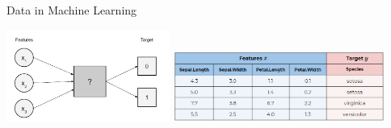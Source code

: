 \documentclass[11pt,compress,t,notes=noshow, xcolor=table]{beamer}
\begin{document}
\begin{vbframe}{Data in Machine Learning}
\begin{itemize}
    \includegraphics[width = 0.4\textwidth]{figure_man/feat_targ_rel.jpg}
    \includegraphics[width = 0.52\textwidth]{figure_man/ml-basic-data-example-iris.png} 

\end{itemize}

\end{vbframe}

\end{document}
